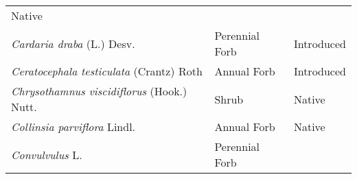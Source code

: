 \documentclass[8pt,]{article}
\begin{document}
\begin{longtable}[]{@{}lll@{}}
\begin{minipage}[t]{0.15\columnwidth}
Native\strut
\end{minipage}\tabularnewline
\begin{minipage}[t]{0.49\columnwidth}\raggedright\strut
\emph{Cardaria draba} (L.) Desv.\strut
\end{minipage} & \begin{minipage}[t]{0.27\columnwidth}\raggedright\strut
Perennial Forb\strut
\end{minipage} & \begin{minipage}[t]{0.15\columnwidth}\raggedright\strut
Introduced\strut
\end{minipage}\tabularnewline
\begin{minipage}[t]{0.49\columnwidth}\raggedright\strut
\emph{Ceratocephala testiculata} (Crantz) Roth\strut
\end{minipage} & \begin{minipage}[t]{0.27\columnwidth}\raggedright\strut
Annual Forb\strut
\end{minipage} & \begin{minipage}[t]{0.15\columnwidth}\raggedright\strut
Introduced\strut
\end{minipage}\tabularnewline
\begin{minipage}[t]{0.49\columnwidth}\raggedright\strut
\emph{Chrysothamnus viscidiflorus} (Hook.) Nutt.\strut
\end{minipage} & \begin{minipage}[t]{0.27\columnwidth}\raggedright\strut
Shrub\strut
\end{minipage} & \begin{minipage}[t]{0.15\columnwidth}\raggedright\strut
Native\strut
\end{minipage}\tabularnewline
\begin{minipage}[t]{0.49\columnwidth}\raggedright\strut
\emph{Collinsia parviflora} Lindl.\strut
\end{minipage} & \begin{minipage}[t]{0.27\columnwidth}\raggedright\strut
Annual Forb\strut
\end{minipage} & \begin{minipage}[t]{0.15\columnwidth}\raggedright\strut
Native\strut
\end{minipage}\tabularnewline
\begin{minipage}[t]{0.49\columnwidth}\raggedright\strut
\emph{Convulvulus} L.\strut
\end{minipage} & \begin{minipage}[t]{0.27\columnwidth}\raggedright\strut
Perennial Forb\strut
\end{minipage} & \begin{minipage}[t]{0.15\columnwidth}\raggedright\strut

\end{minipage}
\end{longtable}
\end{document}
